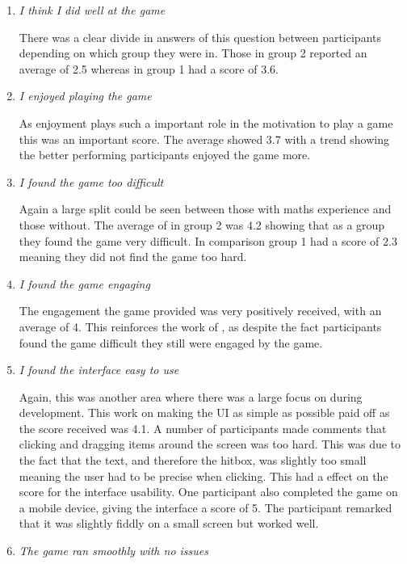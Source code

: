 \documentclass[12pt,a4paper]{report}
\begin{document}
\begin{enumerate}
	\item  \textit {I think I did well at the game}
	
	There was a clear divide in answers of this question between participants depending on which group they were in. Those in group 2 reported an average of 2.5 whereas in group 1 had a score of 3.6. 
	
	\item  \textit {I enjoyed playing the game}
	
	As enjoyment plays such a important role in the motivation to play a game this was an important score. The average showed 3.7 with a trend showing the better performing participants enjoyed the game more. 
	
	\item  \textit {I found the game too difficult}
	
	Again a large split could be seen between those with maths experience and those without. The average of in group 2 was 4.2 showing that as a group they found the game very difficult. In comparison group 1 had a score of 2.3 meaning they did not find the game too hard.
	
	\item  \textit {I found the game engaging}
	
	The engagement the game provided was very positively received, with an average of 4. This reinforces the work of \cite{abuhamdeh2012importance}, as despite the fact participants found the game difficult they still were engaged by the game.
	
	\item  \textit {I found the interface easy to use}

Again, this was another area where there was a large focus on during development. This work on making the UI as simple as possible paid off as the score received was 4.1. A number of participants made comments that clicking and dragging items around the screen was too hard. This was due to the fact that the text, and therefore the hitbox, was slightly too small meaning the user had to be precise when clicking. This had a effect on the score for the interface usability. One participant also completed the game on a mobile device, giving the interface a score of 5. The participant remarked that it was slightly fiddly on a small screen but worked well.
	
	\item  \textit {The game ran smoothly with no issues}
	

\end{enumerate}
\end{document}
